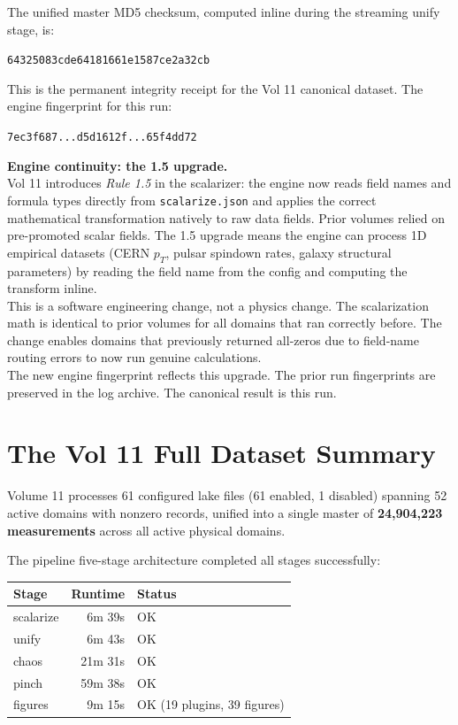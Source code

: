 \documentclass[11pt, letterpaper, openany]{book}
\begin{document}
The unified master MD5 checksum, computed inline during the streaming unify
stage, is:

\begin{center}
\texttt{64325083cde64181661e1587ce2a32cb}
\end{center}

This is the permanent integrity receipt for the Vol 11 canonical dataset.
The engine fingerprint for this run:

\begin{center}
\texttt{7ec3f687...d5d1612f...65f4dd72}
\end{center}

\begin{warningbox}
\textbf{Engine continuity: the 1.5 upgrade.}\\[0.5em]
Vol 11 introduces \textit{Rule 1.5} in the scalarizer: the engine now reads
field names and formula types directly from \texttt{scalarize.json} and
applies the correct mathematical transformation natively to raw data fields.
Prior volumes relied on pre-promoted scalar fields. The 1.5 upgrade means the
engine can process 1D empirical datasets (CERN $p_T$, pulsar spindown rates,
galaxy structural parameters) by reading the field name from the config and
computing the transform inline.\\[0.5em]
This is a software engineering change, not a physics change. The scalarization
math is identical to prior volumes for all domains that ran correctly before.
The change enables domains that previously returned all-zeros due to field-name
routing errors to now run genuine calculations.\\[0.5em]
The new engine fingerprint reflects this upgrade. The prior run fingerprints
are preserved in the log archive. The canonical result is this run.
\end{warningbox}

\section{The Vol 11 Full Dataset Summary}

Volume 11 processes 61 configured lake files (61 enabled, 1 disabled) spanning
52 active domains with nonzero records, unified into a single master of
\textbf{24,904,223 measurements} across all active physical domains.

The pipeline five-stage architecture completed all stages successfully:

\begin{center}
\begin{tabular}{|l|r|l|}
\hline
\rowcolor{kishblue!10}
\textbf{Stage} & \textbf{Runtime} & \textbf{Status} \\
\hline\hline
scalarize & 6m 39s & OK \\
unify     & 6m 43s & OK \\
chaos     & 21m 31s & OK \\
pinch     & 59m 38s & OK \\
figures   & 9m 15s  & OK (19 plugins, 39 figures) \\
\hline
\end{tabular}
\end{center}
\end{document}
